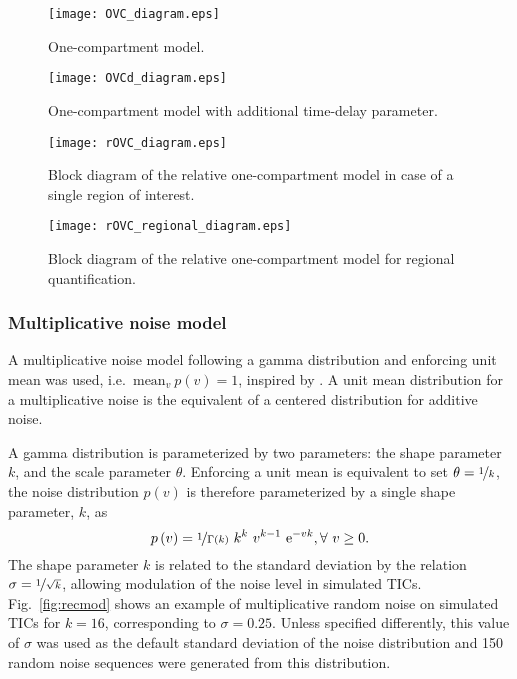 \begin{subfigures}
    \begin{figure}[bh]\centering
    \texttt{[image: OVC\_diagram.eps]}
    \caption{One-compartment model.}
    \label{fig:OVC_model}
    \end{figure}
    \begin{figure}[bh]\centering
    \texttt{[image: OVCd\_diagram.eps]}
    \caption{One-compartment model with additional time-delay parameter.}
    \label{fig:OVCd_model}
    \end{figure}
    \begin{figure}[bh]\centering
    \texttt{[image: rOVC\_diagram.eps]}
    \caption{Block diagram of the relative one-compartment model in case of a single region of interest.}
    \label{fig:rOVC_model}
    \end{figure}
    \begin{figure}[bh]\centering
    \texttt{[image: rOVC\_regional\_diagram.eps]}
    \caption{Block diagram of the relative one-compartment model for regional quantification.}
    \label{fig:rOVC_regional}
    \end{figure}
\end{subfigures}

\subsubsection{Multiplicative noise model}\label{sec:NoiseModel}
A multiplicative noise model following a gamma distribution and enforcing unit mean was used, i.e.~$\mathrm{mean}_v~p\left(v\right) = 1$, inspired by \citet{Barrois:2013gw}.
A unit mean distribution for a multiplicative noise is the equivalent of a centered distribution for additive noise.

A gamma distribution is parameterized by two parameters: the shape parameter $k$, and the scale parameter $\theta$.
Enforcing a unit mean is equivalent to set $\theta = \nicefrac{1}{k}$, the noise distribution $p\left(v\right)$ is therefore parameterized by a single shape parameter, $k$, as
\begin{equation}
p\left(v\right) = \nicefrac{1}{\Gamma\left(k\right)} ~ k^k ~ v^{k-1} ~ \mathrm e^{-vk}, \forall~v \geq 0.
\end{equation}
The shape parameter $k$ is related to the standard deviation by the relation $\sigma = \nicefrac{1}{\sqrt{k}}$, allowing modulation of the noise level in simulated TICs.
Fig.~\ref{fig:recmod} shows an example of multiplicative random noise on simulated TICs for $k = 16$, corresponding to $\sigma = 0.25$.
Unless specified differently, this value of $\sigma$ was used as the default standard deviation of the noise distribution and 150 random noise sequences were generated from this distribution.

